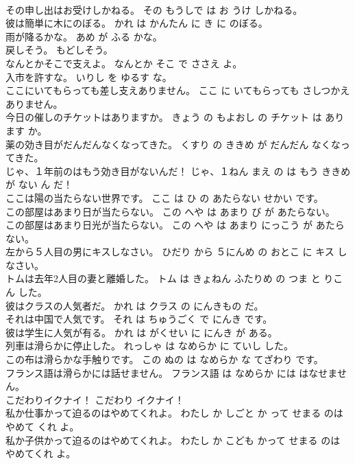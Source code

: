 \documentclass[8pt]{extreport}
\begin{document}
\begin{CJK}{UTF8}{min}
\\	その申し出はお受けしかねる。	その もうしで は お うけ しかねる。	
\\	彼は簡単に木にのぼる。	かれ は かんたん に き に のぼる。	
\\	雨が降るかな。	あめ が ふる かな。	
\\	戻しそう。	もどしそう。	
\\	なんとかそこで支えよ。	なんとか そこ で ささえ よ。	
\\	入市を許すな。	いりし を ゆるす な。	
\\	ここにいてもらっても差し支えありません。	ここ に いてもらっても さしつかえありません。	
\\	今日の催しのチケットはありますか。	きょう の もよおし の チケット は あります か。	
\\	薬の効き目がだんだんなくなってきた。	くすり の ききめ が だんだん なくなってきた。	
\\	じゃ、１年前のはもう効き目がないんだ！	じゃ、１ねん まえ の は もう ききめ が ない ん だ！	
\\	ここは陽の当たらない世界です。	ここ は ひ の あたらない せかい です。	
\\	この部屋はあまり日が当たらない。	この へや は あまり び が あたらない。	
\\	この部屋はあまり日光が当たらない。	この へや は あまり にっこう が あたらない。	
\\	左から５人目の男にキスしなさい。	ひだり から ５にんめ の おとこ に キス しなさい。	
\\	トムは去年2人目の妻と離婚した。	トム は きょねん ふたりめ の つま と りこん した。	
\\	彼はクラスの人気者だ。	かれ は クラス の にんきもの だ。	
\\	それは中国で人気です。	それ は ちゅうごく で にんき です。	
\\	彼は学生に人気が有る。	かれ は がくせい に にんき が ある。	
\\	列車は滑らかに停止した。	れっしゃ は なめらか に ていし した。	
\\	この布は滑らかな手触りです。	この ぬの は なめらか な てざわり です。	
\\	フランス語は滑らかには話せません。	フランス語 は なめらか には はなせません。	
\\	こだわりイクナイ！	こだわり イクナイ！	
\\	私か仕事かって迫るのはやめてくれよ。	わたし か しごと か って せまる のは やめて くれ よ。	
\\	私か子供かって迫るのはやめてくれよ。	わたし か こども かって せまる のは やめてくれ よ。	

\end{CJK}
\end{document}
